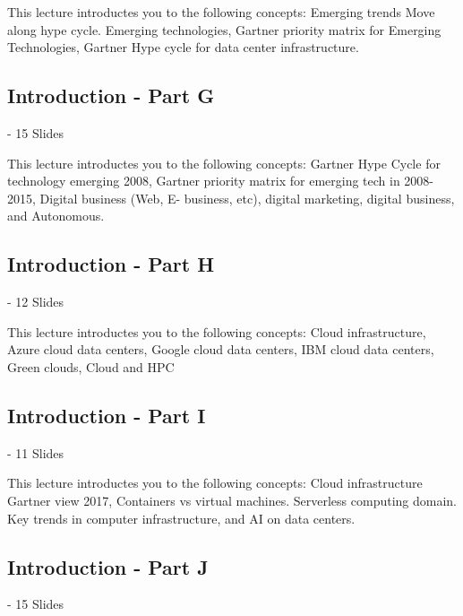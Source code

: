 This lecture introductes you to the following concepts: Emerging
trends Move along hype cycle. Emerging technologies, Gartner priority
matrix for Emerging Technologies, Gartner Hype cycle for data center
infrastructure.

\subsection{Introduction - Part G}\label{s:cloud-fundamentals-g}
 - 15 Slides

This lecture introductes you to the following concepts: Gartner Hype
Cycle for technology emerging 2008, Gartner priority matrix for
emerging tech in 2008-2015, Digital business (Web, E- business, etc),
digital marketing, digital business, and Autonomous.

\subsection{Introduction - Part H}\label{s:cloud-fundamentals-h}

 - 12 Slides

This lecture introductes you to the following concepts: Cloud
infrastructure, Azure cloud data centers, Google cloud data centers,
IBM cloud data centers, Green clouds, Cloud and HPC

\subsection{Introduction - Part I}\label{s:cloud-fundamentals-i}
 - 11 Slides

This lecture introductes you to the following concepts: Cloud
infrastructure Gartner view 2017, Containers vs virtual
machines. Serverless computing domain. Key trends in computer
infrastructure, and AI on data centers.

\subsection{Introduction - Part J}\label{s:cloud-fundamentals-j}
 - 15 Slides

